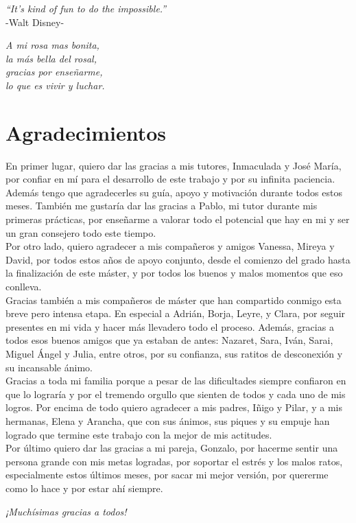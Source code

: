 {
	\vspace*{1cm}
	\begin{flushright}
		\textit{``It's kind of fun to do the impossible.''}\\
		\vspace{10pt}
		-Walt Disney-
	\end{flushright}
	
	\vspace*{14cm}
	\begin{flushright}
		\textit{A mi rosa mas bonita,\\
		la más bella del rosal,\\
		gracias por enseñarme,\\
		lo que es vivir y luchar.}
	\end{flushright}
}

\chapter*{Agradecimientos}

En primer lugar, quiero dar las gracias a mis tutores, Inmaculada y José María, por confiar en mí para el desarrollo de este trabajo y por su infinita paciencia. Además tengo que agradecerles su guía, apoyo y motivación durante todos estos meses. También me gustaría dar las gracias a Pablo, mi tutor durante mis primeras prácticas, por enseñarme a valorar todo el potencial que hay en mi y ser un gran consejero todo este tiempo.\\
 
Por otro lado, quiero agradecer a mis compañeros y amigos Vanessa, Mireya y David, por todos estos años de apoyo conjunto, desde el comienzo del grado hasta la finalización de este máster, y por todos los buenos y malos momentos que eso conlleva.\\

Gracias también a mis compañeros de máster que han compartido conmigo esta breve pero intensa etapa. En especial a Adrián, Borja, Leyre, y Clara, por seguir presentes en mi vida y hacer más llevadero todo el proceso. Además, gracias a todos esos buenos amigos que ya estaban de antes: Nazaret, Sara, Iván, Sarai, Miguel Ángel y Julia, entre otros, por su confianza, sus ratitos de desconexión y su incansable ánimo.\\

Gracias a toda mi familia porque a pesar de las dificultades siempre confiaron en que lo lograría y por el tremendo orgullo que sienten de todos y cada uno de mis logros. Por encima de todo quiero agradecer a mis padres, Iñigo y Pilar, y a mis hermanas, Elena y Arancha, que con sus ánimos, sus piques y su empuje han logrado que termine este trabajo con la mejor de mis actitudes.\\

Por último quiero dar las gracias a mi pareja, Gonzalo, por hacerme sentir una persona grande con mis metas logradas, por soportar el estrés y los malos ratos, especialmente estos últimos meses, por sacar mi mejor versión, por quererme como lo hace y por estar ahí siempre.

\begin{flushright}
	\emph{¡Muchísimas gracias a todos!}
\end{flushright}